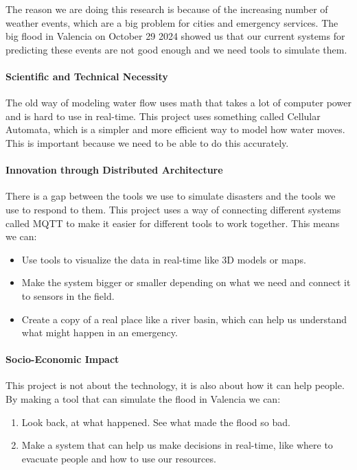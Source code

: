 The reason we are doing this research is because of the increasing number of weather events, which are a big problem for cities and 
emergency services. The big flood in Valencia on October 29 2024 showed us that our current systems for predicting these events are 
not good enough and we need tools to simulate them.

\paragraph{Scientific and Technical Necessity}

The old way of modeling water flow uses math that takes a lot of computer power and is hard to use in real-time. This project uses 
something called Cellular Automata, which is a simpler and more efficient way to model how water moves. This is important because we 
need to be able to do this accurately.

\paragraph{Innovation through Distributed Architecture}

There is a gap between the tools we use to simulate disasters and the tools we use to respond to them. This project uses a way of 
connecting different systems called MQTT to make it easier for different tools to work together. This means we can:

\begin{itemize}
\item Use tools to visualize the data in real-time like 3D models or maps.
\item Make the system bigger or smaller depending on what we need and connect it to sensors in the field.
\item Create a copy of a real place like a river basin, which can help us understand what might happen in an emergency.
\end{itemize}

\paragraph{Socio-Economic Impact}

This project is not about the technology, it is also about how it can help people. By making a tool that can simulate the flood in 
Valencia we can:

\begin{enumerate}
\item Look back, at what happened. See what made the flood so bad.
\item Make a system that can help us make decisions in real-time, like where to evacuate people and how to use our resources.
\end{enumerate}


